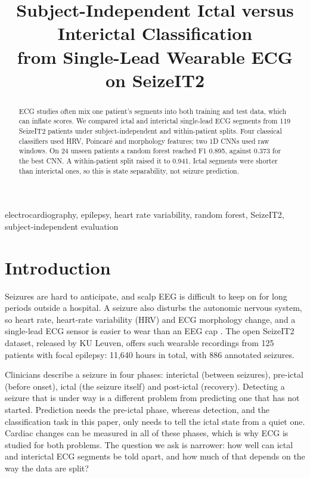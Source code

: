 \documentclass[conference,a4paper]{IEEEtran}
\begin{document}
\title{Subject-Independent Ictal versus Interictal Classification\\
from Single-Lead Wearable ECG on SeizeIT2}

\author{
}

\maketitle

\begin{abstract}
ECG studies often mix one patient's segments into both training and test
data, which can inflate scores. We compared ictal and interictal single-lead
ECG segments from 119 SeizeIT2 patients under subject-independent and
within-patient splits. Four classical classifiers used HRV, Poincar\'e and
morphology features; two 1D CNNs used raw windows. On 24 unseen patients a
random forest reached F1 0.895, against 0.373 for the best CNN. A
within-patient split raised it to 0.941. Ictal segments were shorter than
interictal ones, so this is state separability, not seizure prediction.
\end{abstract}

\begin{IEEEkeywords}
electrocardiography, epilepsy, heart rate variability, random forest,
SeizeIT2, subject-independent evaluation
\end{IEEEkeywords}

\section{Introduction}
Seizures are hard to anticipate, and scalp EEG is difficult to keep on for
long periods outside a hospital. A seizure also disturbs the autonomic
nervous system, so heart rate, heart-rate variability (HRV) and ECG
morphology change, and a single-lead ECG sensor is easier to wear than an
EEG cap \cite{Seifi2022,Abtahi2025}. The open SeizeIT2 dataset, released by
KU Leuven, offers such wearable recordings from 125 patients with focal
epilepsy: 11,640 hours in total, with 886 annotated seizures.

Clinicians describe a seizure in four phases: interictal (between seizures),
pre-ictal (before onset), ictal (the seizure itself) and post-ictal
(recovery). Detecting a seizure that is under way is a different problem
from predicting one that has not started. Prediction needs the pre-ictal
phase, whereas detection, and the classification task in this paper, only
needs to tell the ictal state from a quiet one. Cardiac changes can be
measured in all of these phases, which is why ECG is studied for both
problems. The question we ask is narrower: how well can ictal and interictal
ECG segments be told apart, and how much of that depends on the way the data
are split?
\end{document}
